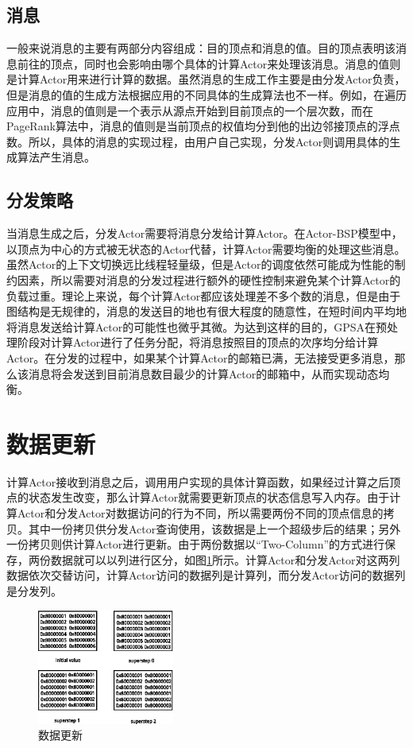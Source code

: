 \subsection{消息}
一般来说消息的主要有两部分内容组成：目的顶点和消息的值。目的顶点表明该消息前往的顶点，同时也会影响由哪个具体的计算Actor来处理该消息。消息的值则是计算Actor用来进行计算的数据。虽然消息的生成工作主要是由分发Actor负责，但是消息的值的生成方法根据应用的不同具体的生成算法也不一样。例如，在遍历应用中，消息的值则是一个表示从源点开始到目前顶点的一个层次数，而在PageRank算法中，消息的值则是当前顶点的权值均分到他的出边邻接顶点的浮点数。所以，具体的消息的实现过程，由用户自己实现，分发Actor则调用具体的生成算法产生消息。
\subsection{分发策略}
当消息生成之后，分发Actor需要将消息分发给计算Actor。在Actor-BSP模型中，以顶点为中心的方式被无状态的Actor代替，计算Actor需要均衡的处理这些消息。虽然Actor的上下文切换远比线程轻量级，但是Actor的调度依然可能成为性能的制约因素，所以需要对消息的分发过程进行额外的硬性控制来避免某个计算Actor的负载过重。理论上来说，每个计算Actor都应该处理差不多个数的消息，但是由于图结构是无规律的，消息的发送目的地也有很大程度的随意性，在短时间内平均地将消息发送给计算Actor的可能性也微乎其微。为达到这样的目的，GPSA在预处理阶段对计算Actor进行了任务分配，将消息按照目的顶点的次序均分给计算Actor。在分发的过程中，如果某个计算Actor的邮箱已满，无法接受更多消息，那么该消息将会发送到目前消息数目最少的计算Actor的邮箱中，从而实现动态均衡。

\section{数据更新}
计算Actor接收到消息之后，调用用户实现的具体计算函数，如果经过计算之后顶点的状态发生改变，那么计算Actor就需要更新顶点的状态信息写入内存。由于计算Actor和分发Actor对数据访问的行为不同，所以需要两份不同的顶点信息的拷贝。其中一份拷贝供分发Actor查询使用，该数据是上一个超级步后的结果；另外一份拷贝则供计算Actor进行更新。由于两份数据以“Two-Column”的方式进行保存，两份数据就可以以列进行区分，如图\ref{fig:vu}所示。计算Actor和分发Actor对这两列数据依次交替访问，计算Actor访问的数据列是计算列，而分发Actor访问的数据列是分发列。

\begin{figure}[htbp]
\centering
\includegraphics[width=0.4\textwidth]{myfigures/valueupdating.eps}
\caption{数据更新}\label{fig:vu}
\vspace{\baselineskip}
\end{figure}

